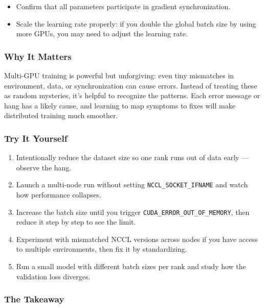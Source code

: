 \documentclass[
  letterpaper,
  DIV=11,
  numbers=noendperiod]{scrreprt}
\providecommand{\tightlist}{%
  \setlength{\itemsep}{0pt}\setlength{\parskip}{0pt}}
\begin{document}
\begin{itemize}
\tightlist
\item
  Confirm that all parameters participate in gradient synchronization.
\item
  Scale the learning rate properly: if you double the global batch size
  by using more GPUs, you may need to adjust the learning rate.
\end{itemize}

\subsubsection{Why It Matters}\label{why-it-matters-54}

Multi-GPU training is powerful but unforgiving: even tiny mismatches in
environment, data, or synchronization can cause errors. Instead of
treating these as random mysteries, it's helpful to recognize the
patterns. Each error message or hang has a likely cause, and learning to
map symptoms to fixes will make distributed training much smoother.

\subsubsection{Try It Yourself}\label{try-it-yourself-68}

\begin{enumerate}
\def\labelenumi{\arabic{enumi}.}
\tightlist
\item
  Intentionally reduce the dataset size so one rank runs out of data
  early --- observe the hang.
\item
  Launch a multi-node run without setting \texttt{NCCL\_SOCKET\_IFNAME}
  and watch how performance collapses.
\item
  Increase the batch size until you trigger
  \texttt{CUDA\_ERROR\_OUT\_OF\_MEMORY}, then reduce it step by step to
  see the limit.
\item
  Experiment with mismatched NCCL versions across nodes if you have
  access to multiple environments, then fix it by standardizing.
\item
  Run a small model with different batch sizes per rank and study how
  the validation loss diverges.
\end{enumerate}

\subsubsection{The Takeaway}\label{the-takeaway-69}
\end{document}
